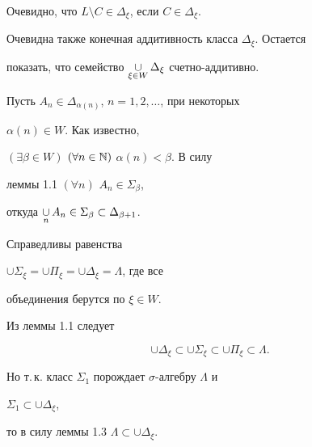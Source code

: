 \begin{pf} 


Очевидно, что $L\setminus C\in\Delta_\xi$, если $C\in\Delta_\xi$. 


Очевидна также конечная аддитивность класса $\Delta_\xi$. Остается 


показать, что семейство $\mathop{\cup}\limits_{\xi\in W}\Delta_\xi$ счетно-аддитивно. 


 


Пусть $A_n\in\Delta_{\alpha(n)}$, $n=1,2,\dotsc$, при некоторых 


$\alpha(n)\in W$. Как известно, 


$(\exists\beta\in W)$ $(\forall n\in\Bbb N)$ $\alpha(n)<\beta$. В силу 


леммы 1.1 $(\forall n)$ $A_n\in\Sigma_\beta$, 


откуда $\mathop{\cup}\limits_n A_n\in\Sigma_\beta\subset\Delta_{\beta+1}$. 


\end{pf} 


 


 


\begin{props} 


Справедливы равенства


$\cup\Sigma_\xi=\cup\Pi_\xi=\cup\Delta_\xi=\Lambda$, где все 


объединения берутся по $\xi\in W$. 


\end{props} 


 


\begin{pf} 


Из леммы 1.1 следует 


$$ 


\cup\Delta_\xi\subset\cup\Sigma_\xi\subset\cup\Pi_\xi 


\subset\Lambda. 


$$ 


Но т.\,к. класс $\Sigma_1$ порождает $\sigma$-алгебру $\Lambda$ и 


$\Sigma_1\subset\cup\Delta_\xi$, 


то в силу леммы 1.3 $\Lambda\subset\cup\Delta_\xi$. 


\end{pf} 


 


